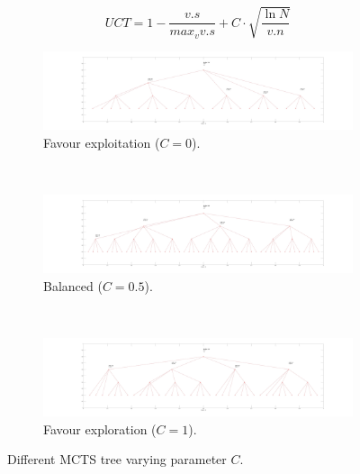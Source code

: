 \documentclass[11pt]{article}
\begin{document}
\begin{equation}
    UCT = 1 - \frac{v.s}{max_v v.s} + C \cdot \sqrt{\frac{\ln N}{v.n}}
\end{equation}


\begin{figure}[H]
\begin{subfigure}{\textwidth}
  \centering
  \includegraphics[width=\linewidth]{img/c00wide.jpg}
  \caption{Favour exploitation ($C=0$).}
  \label{fig:c0}
\end{subfigure}\\
\begin{subfigure}{\textwidth}
  \centering
  \includegraphics[width=\linewidth]{img/c05wide.jpg}
  \caption{Balanced ($C=0.5$).}
  \label{fig:c05}
\end{subfigure}\\
\begin{subfigure}{\textwidth}
  \centering
  \includegraphics[width=\linewidth]{img/c10wide.jpg}
  \caption{Favour exploration ($C=1$).}
  \label{fig:c1}
\end{subfigure}
\caption{Different MCTS tree varying parameter $C$.}
\label{fig:C}
\end{figure}
\end{document}
